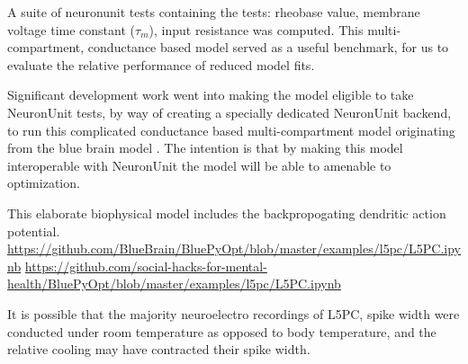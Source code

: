 %
A suite of neuronunit tests containing the tests: rheobase value, membrane voltage time constant ($\tau_{m}$), input resistance was computed. This multi-compartment, conductance based model served as a useful benchmark, for us to evaluate the relative performance of reduced model fits. 



Significant development work went into making the model eligible to take NeuronUnit tests, by way of creating a specially dedicated NeuronUnit backend, to run this complicated conductance based multi-compartment model originating from the blue brain model \cite{markram2015reconstruction}. The intention is that by making this model interoperable with NeuronUnit the model will be able to amenable to optimization.


This elaborate biophysical model includes the backpropogating dendritic action potential.
\url{https://github.com/BlueBrain/BluePyOpt/blob/master/examples/l5pc/L5PC.ipynb}
\url{https://github.com/social-hacks-for-mental-health/BluePyOpt/blob/master/examples/l5pc/L5PC.ipynb}


It is possible that the majority neuroelectro recordings of L5PC, spike width were conducted under room temperature as opposed to body temperature, and the relative cooling may have contracted their spike width.
\cite{goldin2017temperature}

